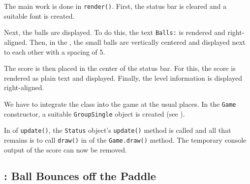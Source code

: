 \begin{figure}%
	\begin{center}%
		\vspace{-6ex}%
	\end{center}%
\end{figure}%
The main work is done in \texttt{render()}. First, the status bar is cleared and a suitable font is created. 

Next, the balls are displayed. To do this, the text \verb=Balls:= is rendered and right-aligned. Then, in the \forSchleife, the small balls are vertically centered and displayed next to each other with a spacing of \SI{5}{\pixel}.

The score is then placed in the center of the status bar. For this, the score is rendered as plain text and displayed. Finally, the level information is displayed right-aligned.

\newpage
{}

We have to integrate the class into the game at the usual places. In the \texttt{Game} constructor, a suitable \texttt{GroupSingle} object is created (see ). 


In  of \texttt{update()}, the \texttt{Status} object's \texttt{update()} method is called and all that remains is to call \texttt{draw()} in  of the \texttt{Game.draw()} method. The temporary console output of the score can now be removed.





\subsection{: Ball Bounces off the Paddle}

